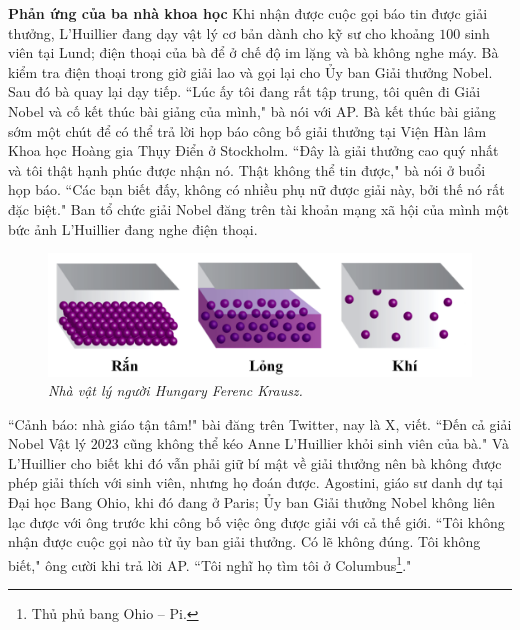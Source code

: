 \begin{multicols}{2}
	\textbf{\color{timhieukhoahoc}Phản ứng của ba nhà khoa học}
	\vskip 0.1cm
	Khi nhận được cuộc gọi báo tin được giải thưởng, L'Huillier đang dạy vật lý cơ bản dành cho kỹ sư cho khoảng $100$ sinh viên tại Lund; điện thoại của bà để ở chế độ im lặng và bà không nghe máy. Bà kiểm tra điện thoại trong giờ giải lao và gọi lại cho Ủy ban Giải thưởng Nobel.
	\vskip 0.1cm
	Sau đó bà quay lại dạy tiếp.
	\vskip 0.1cm
	``Lúc ấy tôi đang rất tập trung, tôi quên đi Giải Nobel và cố kết thúc bài giảng của mình," bà nói với AP. Bà kết thúc bài giảng sớm một chút để có thể trả lời họp báo công bố giải thưởng tại Viện Hàn lâm Khoa học Hoàng gia Thụy Điển ở Stockholm.
	\vskip 0.1cm
	``Đây là giải thưởng cao quý nhất và tôi thật hạnh phúc được nhận nó. Thật không thể tin được," bà nói ở buổi họp báo. ``Các bạn biết đấy, không có nhiều phụ nữ được giải này, bởi thế nó rất đặc biệt."
	\vskip 0.1cm
	Ban tổ chức giải Nobel đăng trên tài khoản mạng xã hội của mình một bức ảnh L'Huillier đang nghe điện thoại.
	\begin{figure}[H]
		\vspace*{-5pt}
		\centering
		\captionsetup{labelformat= empty, justification=centering}
		\includegraphics[width= 1\linewidth]{7}
		\caption{\small\textit{\color{timhieukhoahoc}Nhà vật lý người Hungary Ferenc Krausz.}}
		\vspace*{-10pt}
	\end{figure}
	``Cảnh báo: nhà giáo tận tâm!" bài đăng trên Twitter, nay là X, viết. ``Đến cả giải Nobel Vật lý $2023$ cũng không thể kéo Anne L'Huillier khỏi sinh viên của bà."
	\vskip 0.1cm
	Và L'Huillier cho biết khi đó vẫn phải giữ bí mật về giải thưởng nên bà không được phép giải thích với sinh viên, nhưng họ đoán được.
	\vskip 0.1cm
	Agostini, giáo sư danh dự tại Đại học Bang Ohio, khi đó đang ở Paris; Ủy ban Giải thưởng Nobel không liên lạc được với ông trước khi công bố việc ông được giải với cả thế giới.
	\vskip 0.1cm
	``Tôi không nhận được cuộc gọi nào từ ủy ban giải thưởng. Có lẽ không đúng. Tôi không biết," ông cười khi trả lời AP. ``Tôi nghĩ họ tìm tôi ở Columbus\footnote[4]{\color{timhieukhoahoc}Thủ phủ bang Ohio -- Pi.}."

\end{multicols}
